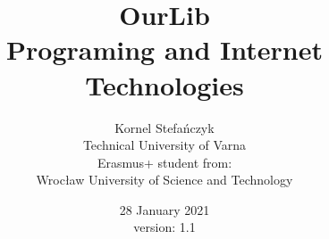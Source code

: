 


\title{OurLib\\ \large{Programing and Internet Technologies}}
\author{Kornel Stefańczyk 
\\Technical University of Varna
\\ Erasmus+ student from: 
\\ Wrocław University of Science and Technology}
\date{28 January 2021 \\version: 1.1}



\maketitle
\newpage
\tableofcontents
\newpage









